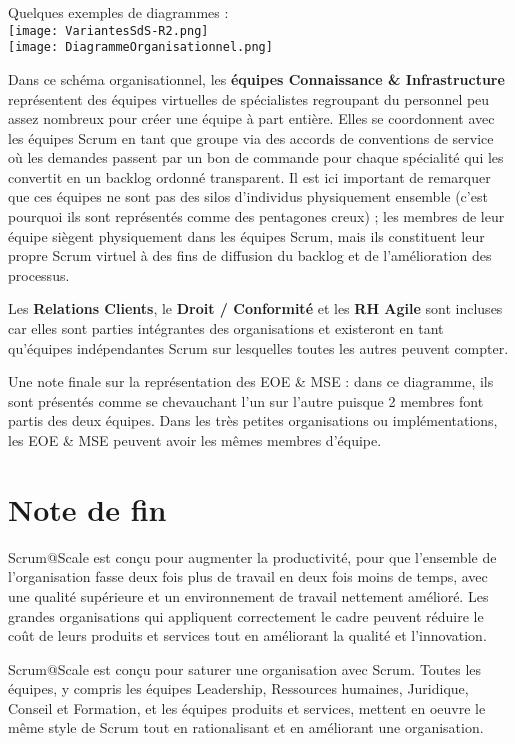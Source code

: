 \documentclass[french,12pt,a4paper,parskip=full]{scrartcl}
\begin{document}
Quelques exemples de diagrammes :\\
\texttt{[image: VariantesSdS-R2.png]}\\
\texttt{[image: DiagrammeOrganisationnel.png]}

Dans ce schéma organisationnel, les \textbf{équipes Connaissance \& Infrastructure}
représentent des équipes virtuelles de spécialistes regroupant du personnel peu assez
nombreux pour créer une équipe à part entière. Elles se coordonnent avec les équipes
Scrum en tant que groupe via des accords de conventions de service où les demandes
passent par un bon de commande pour chaque spécialité qui les convertit en un backlog
ordonné transparent. Il est ici important de remarquer que ces équipes ne sont pas des
silos d'individus physiquement ensemble (c'est pourquoi ils sont représentés comme des
pentagones creux) ; les membres de leur équipe siègent physiquement dans les équipes
Scrum, mais ils constituent leur propre Scrum virtuel à des fins de diffusion du backlog et
de l'amélioration des processus.

Les \textbf{Relations Clients}, le \textbf{Droit / Conformité} et les \textbf{RH Agile} sont incluses car elles sont
parties intégrantes des organisations et existeront en tant qu'équipes indépendantes
Scrum sur lesquelles toutes les autres peuvent compter.

Une note finale sur la représentation des EOE \& MSE : dans ce diagramme, ils sont
présentés comme se chevauchant l'un sur l'autre puisque 2 membres font partis des deux
équipes. Dans les très petites organisations ou implémentations, les EOE \& MSE peuvent
avoir les mêmes membres d'équipe.

\section{Note de fin}
Scrum@Scale est conçu pour augmenter la productivité, pour que l'ensemble de
l'organisation fasse deux fois plus de travail en deux fois moins de temps, avec une qualité
supérieure et un environnement de travail nettement amélioré. Les grandes organisations
qui appliquent correctement le cadre peuvent réduire le coût de leurs produits et services
tout en améliorant la qualité et l'innovation.

Scrum@Scale est conçu pour saturer une organisation avec Scrum. Toutes les équipes, y
compris les équipes Leadership, Ressources humaines, Juridique, Conseil et Formation,
et les équipes produits et services, mettent en oeuvre le même style de Scrum tout en
rationalisant et en améliorant une organisation.
\end{document}
